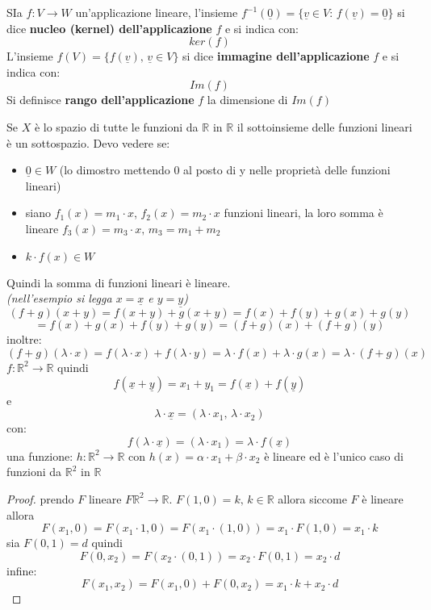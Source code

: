 \documentclass[a4paper,12pt, oneside]{book}
\begin{document}
\newpage
\begin{definizione}
	SIa $f:V\rightarrow W$ un'applicazione lineare, l'insieme $f^{-1}(\underline{0})=\{\underline{v}\in V:\, f(\underline{v})=\underline{0}\}$ si dice \textbf{nucleo (kernel) dell'applicazione} $f$ e si indica con:
	$$ker(f)$$
	L'insieme $f(V)=\{f(\underline{v}),\, \underline{v}\in V\}$ si dice \textbf{immagine dell'applicazione} $f$ e si indica con:
	$$Im(f)$$
	Si definisce \textbf{rango dell'applicazione} $f$ la dimensione di $Im(f)$
\end{definizione}
Se $X$ è lo spazio di tutte le funzioni da $\mathbb{R}$ in $\mathbb{R}$  il sottoinsieme delle funzioni lineari è un sottospazio. Devo vedere se:
\begin{itemize}
	\item $\underline{0}\in W$ (lo dimostro mettendo 0 al posto di y nelle proprietà delle funzioni lineari)
	\item siano $f_1(x)=m_1\cdot x$, $f_2(x)=m_2\cdot x$ funzioni lineari, la loro somma è lineare $f_3(x)=m_3\cdot x,\, m_3=m_1+m_2$
	\item $k\cdot f(x)\in W$
\end{itemize}
Quindi la somma di funzioni lineari è lineare.\\
\textit{(nell'esempio si legga $x=\underline{x}$ e $y=\underline{y}$)}
$$(f+g)(x+y)=f(x+y)+g(x+y)=f(x)+f(y)+g(x)+g(y)$$$$=f(x)+g(x)+f(y)+g(y)=(f+g)(x)+(f+g)(y)$$
inoltre:
$$(f+g)(\lambda\cdot x)=f(\lambda\cdot x)+f(\lambda\cdot y)=\lambda\cdot f(x)+\lambda\cdot g(x)= \lambda\cdot(f+g)(x)$$
$f:\mathbb{R}^2\rightarrow \mathbb{R}$ quindi $$f(\underline{x}+\underline{y})=x_1+y_1=f(\underline{x})+f(\underline{y})$$
e $$\lambda\cdot\underline{x}=(\lambda\cdot x_1,\,\lambda\cdot x_2)$$
con: $$f(\lambda\cdot\underline{x})=(\lambda\cdot x_1)=\lambda\cdot f(\underline{x})$$
una funzione: $h:\mathbb{R}^2\rightarrow \mathbb{R}$ con $h(x)=\alpha\cdot x_1+\beta\cdot x_2$ è lineare ed è l'unico caso di funzioni da $\mathbb{R}^2$ in $\mathbb{R}$
\begin{proof}
	prendo $F$ lineare $F\mathbb{R}^2\rightarrow \mathbb{R}$. $F(1,0)=k,\, k\in\mathbb{R}$ allora siccome $F$ è lineare allora $$F(x_1,0)=F(x_1\cdot 1, 0)=F(x_1\cdot (1,0))=x_1\cdot F(1,0)=x_1\cdot k$$
	sia $F(0,1)=d$ quindi $$F(0,x_2)=F(x_2\cdot(0,1))=x_2\cdot F(0,1)=x_2\cdot d$$
	infine:
	$$F(x_1,x_2)=F(x_1,0)+F(0,x_2)=x_1\cdot k+x_2\cdot d$$
\end{proof}
\end{document}
